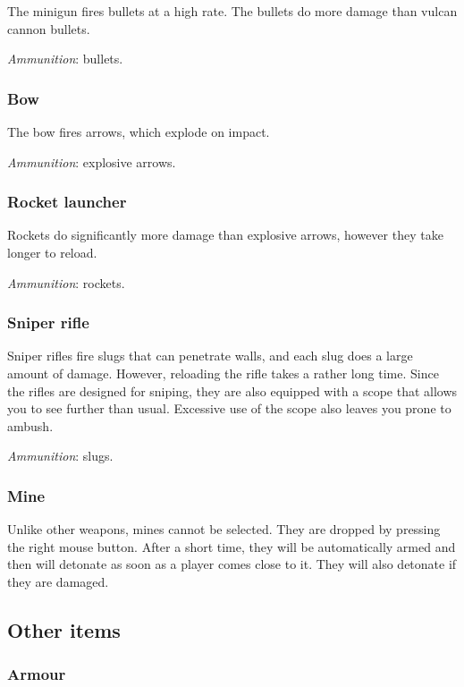 \documentclass[a4paper]{article}
\begin{document}
The minigun fires bullets at a high rate.  The bullets do more damage
than vulcan cannon bullets.

\noindent
\emph{Ammunition}: bullets.

\subsubsection*{Bow}

The bow fires arrows, which explode on impact.

\noindent
\emph{Ammunition}: explosive arrows.

\subsubsection*{Rocket launcher}

Rockets do significantly more damage than explosive arrows, however
they take longer to reload.

\noindent
\emph{Ammunition}: rockets.

\subsubsection*{Sniper rifle}

Sniper rifles fire slugs that can penetrate walls, and each slug does
a large amount of damage.  However, reloading the rifle takes a rather
long time.  Since the rifles are designed for sniping, they are also
equipped with a scope that allows you to see further than usual.
Excessive use of the scope also leaves you prone to ambush.

\noindent
\emph{Ammunition}: slugs.

\subsubsection*{Mine}

Unlike other weapons, mines cannot be selected.  They are dropped by
pressing the right mouse button.  After a short time, they will be
automatically armed and then will detonate as soon as a player comes
close to it.  They will also detonate if they are damaged.


\subsection{Other items}

\subsubsection*{Armour}
\end{document}

